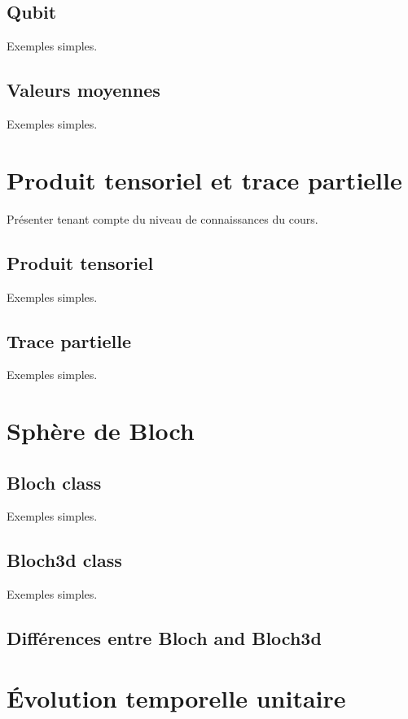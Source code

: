 \subsection{Qubit}

Exemples simples.

\subsection{Valeurs moyennes}

Exemples simples.

\section{Produit tensoriel et trace partielle}

Présenter tenant compte du niveau de connaissances du cours.

\subsection{Produit tensoriel}

Exemples simples.

\subsection{Trace partielle}

Exemples simples.

\section{Sphère de Bloch}


\subsection{Bloch class}

Exemples simples.

\subsection{Bloch3d class}

Exemples simples.

\subsection{Différences entre Bloch and Bloch3d}


\section{Évolution temporelle unitaire}

